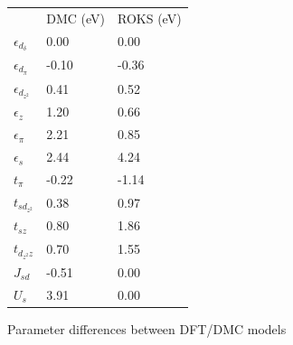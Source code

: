\documentclass{article}
\begin{document}
\begin{figure}
\begin{tabular}{lll}
 &  DMC (eV) & ROKS (eV) \\
$\epsilon_{d_\delta}$ &  0.00 & 0.00  \\
$\epsilon_{d_\pi}$ & -0.10 & -0.36 \\
$\epsilon_{d_{z^2}}$ & 0.41 & 0.52 \\
$\epsilon_z$ & 1.20 & 0.66 \\
$\epsilon_\pi$ & 2.21 & 0.85 \\
$\epsilon_s$ &  2.44 & 4.24 \\
$t_\pi$ & -0.22 & -1.14 \\
$t_{s d_{z^2}}$ & 0.38 & 0.97 \\
$t_{s z}$ & 0.80 & 1.86\\
$t_{d_{z^2} z}$ & 0.70 & 1.55\\
$J_{sd}$ & -0.51 & 0.00 \\ 
$U_s$ & 3.91 & 0.00 \\
\end{tabular}
\caption{Parameter differences between DFT/DMC models}
\end{figure}
\end{document}
